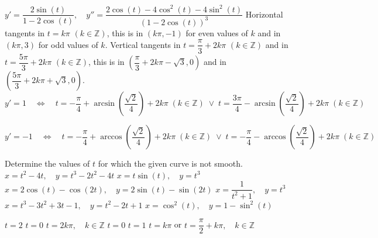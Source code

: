  \begin{Answer}\phantom{}
            \Question $y' = \dfrac{2 \sin(t)}{1-2 \cos(t)}, \quad y'' = \dfrac{2 \cos(t) - 4  \cos^2(t) - 4\sin^2(t)}{(1-2 \cos(t))^3} $
            \Question Horizontal tangents in $t = k \pi$ $(k \in \mathbb{Z})$, this is in $(k \pi, -1)$ for even values of $k$ and in $(k \pi, 3)$ for odd values of $k$. Vertical tangents in $t = \dfrac{\pi}{3} + 2k \pi$ $(k \in \mathbb{Z})$ and in $t = \dfrac{5\pi}{3} + 2k \pi$ $(k \in \mathbb{Z})$, this is in $\left(\dfrac{\pi}{3} + 2k \pi - \sqrt{3}, 0\right)$ and in $\left(\dfrac{5\pi}{3} + 2k \pi + \sqrt{3}, 0\right)$.
            \Question $y' = 1 \quad  \Leftrightarrow \quad  t = - \dfrac{\pi}{4} + \arcsin \left(\dfrac{\sqrt{2}}{4} \right) + 2k\pi \; (k \in \mathbb{Z}) \; \vee \; t = \dfrac{3\pi}{4} - \arcsin \left(\dfrac{\sqrt{2}}{4} \right) + 2k\pi \; (k \in \mathbb{Z}) $
            
             $y' = -1 \quad  \Leftrightarrow \quad  t = - \dfrac{\pi}{4} + \arccos \left(\dfrac{\sqrt{2}}{4} \right) + 2k\pi \; (k \in \mathbb{Z}) \; \vee \;  t = - \dfrac{\pi}{4} - \arccos \left(\dfrac{\sqrt{2}}{4} \right) + 2k\pi \; (k \in \mathbb{Z}) $
   
\end{Answer}   
\fi


\begin{Exercise} Determine the values of $t$ for which the given curve is not smooth.
    \Question[difficulty = 1] $x =t^2-4t, \quad y=t^3-2t^2-4t$ 
    \Question[difficulty = 1] $x =t \sin (t), \quad y=t^3$ 
    \ifanalysis\Question[difficulty = 1]\fi\ifcalculus\Question[difficulty = 2]\fi $x =2\cos(t) - \cos \left(2t \right), \quad y=2\sin(t) - \sin \left(2t \right)$  
    \Question[difficulty = 1] $x = \dfrac{1}{t^2+1}, \quad y = t^3 $
    \Question[difficulty = 1] $x = t^3-3t^2+3t-1, \quad y = t^2-2t+1 $
    \Question[difficulty = 1] $x = \cos^2 (t), \quad y=1-\sin^2(t)$ 

\end{Exercise}

\begin{Answer}\phantom{}
    \begin{multicols}{2}
        
            \Question $t=2$ 
            \Question $t=0$ 
            \Question $t=2k\pi, \quad k \in \mathbb{Z}$ 
            \Question $t=0$ 
            \Question $t=1$ 
            \Question $t=k \pi$ \quad or \quad $t=\dfrac{\pi}{2} + k \pi, \quad k \in \mathbb{Z}$  
        \EndCurrentQuestion
    \end{multicols}
\end{Answer}

